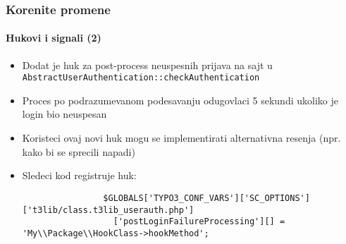 \begin{frame}[fragile]
	\frametitle{Korenite promene}
	\framesubtitle{Hukovi i signali (2)}

	\lstset{basicstyle=\tiny\ttfamily}

	\begin{itemize}

		\item Dodat je huk za post-process neuspesnih prijava na sajt u \texttt{AbstractUserAuthentication::checkAuthentication}

		\item Proces po podrazumevanom podesavanju odugovlaci 5 sekundi ukoliko je login bio neuspesan

		\item Koristeci ovaj novi huk mogu se implementirati alternativna resenja (npr. kako bi se sprecili napadi)

		\item Sledeci kod registruje huk:

			\begin{lstlisting}
				$GLOBALS['TYPO3_CONF_VARS']['SC_OPTIONS']['t3lib/class.t3lib_userauth.php']
				  ['postLoginFailureProcessing'][] = 'My\\Package\\HookClass->hookMethod';
			\end{lstlisting}

	\end{itemize}

\end{frame}


